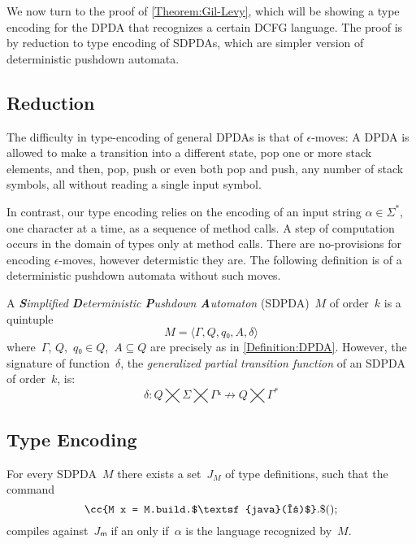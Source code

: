 We now turn to the proof of \cref{Theorem:Gil-Levy}, which will be showing a type encoding for the DPDA that recognizes a certain DCFG language. 
The proof is by reduction to type encoding of SDPDAs, which are simpler version of deterministic pushdown automata. 

\subsection{Reduction}
The difficulty in type-encoding of general DPDAs is that of $\epsilon$-moves:
A DPDA is allowed to make a transition into a different state, 
  pop one or more stack elements, and then, pop, push or even both pop and push, any number of stack symbols,
  all without reading a single input symbol. 

In contrast, our type encoding relies on the encoding of an input string $\alpha \in \Sigma^*$, one character at a time, as a sequence of method calls. 
A step of computation occurs in the domain of \Java types only at method calls. There are no-provisions for encoding $\epsilon$-moves, however determistic
  they are.
The following definition is of a deterministic pushdown automata without such moves.

\begin{Definition}
  \label{Definition:SDPDA}
  A \emph{\textbf Simplified \textbf Deterministic \textbf Pushdown \textbf Automaton} (SDPDA)~$M$ of order~$k$ is a quintuple
  \[
    M =⟨Γ,Q,q₀,A,δ⟩
  \]
  where~$Γ$, $Q$,~$q₀\in Q$,~$A\subseteq Q$ are precisely as in \cref{Definition:DPDA}.
  However, the signature of function~$δ$, the \emph{generalized partial transition function}
  of an SDPDA of order~$k$, is:
  \begin{equation}
    \label{Equation:generalized:transition}
      δ: Q⨉Σ⨉Γᵏ↛Q⨉Γ^*
    \end{equation}
\end{Definition}




\subsection{Type Encoding}
\begin{Theorem}
  \label{Theorem:SDPDA}
  For every SDPDA~$M$ there exists a set~$J_M$ of \Java type definitions, such that
  the command \[
    \cc{M x = M.build.$\textsf{java}(α)$}.\$();
  \]
  compiles against~$Jₘ$ if an only if~$α$ is the language recognized by~$M$.
\end{Theorem}

